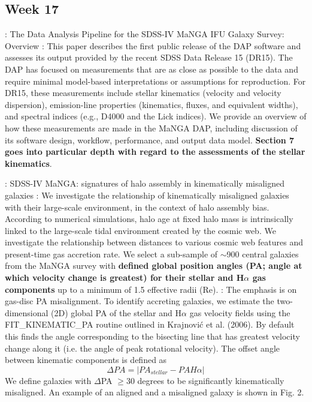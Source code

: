 \documentclass[ceqn,usenatbib,onecolumn]{mnras}
\begin{document}
\subsection{Week 17}
\par \citet{2019arXiv190100856W} : {The Data Analysis Pipeline for the SDSS-IV MaNGA IFU Galaxy Survey: Overview} : This paper describes the first public release of the DAP software and assesses its output provided by the recent SDSS Data Release 15 (DR15). The DAP has focused on measurements that are as close as possible to the data and require minimal model-based interpretations or assumptions for reproduction. For DR15, these measurements include stellar kinematics (velocity and velocity dispersion), emission-line properties (kinematics, fluxes, and equivalent widths), and spectral indices (e.g., D4000 and the Lick indices). We provide an overview of how these measurements are made in the MaNGA DAP, including discussion of its software design, workflow, performance, and output data model. \textbf{Section 7 goes into particular depth with regard to the assessments of the
stellar kinematics}.
\par \citet{2019MNRAS.483..172D} : {SDSS-IV MaNGA: signatures of halo assembly in kinematically misaligned galaxies} : We investigate the relationship of kinematically misaligned galaxies with their large-scale environment, in the context of halo assembly bias. According to numerical simulations, halo age at fixed halo mass is intrinsically linked to the large-scale tidal environment created by the cosmic web. We investigate the relationship between distances to various cosmic web features and present-time gas accretion rate. We select a sub-sample of $\sim$900 central galaxies from the MaNGA survey with \textbf{defined global position angles (PA; angle at which velocity change is greatest) for their stellar and H$\alpha$ gas components} up to a minimum of 1.5 effective radii (Re). : The emphasis is on gas-disc PA misalignment. To identify accreting galaxies, we estimate the two-dimensional (2D) global PA of the stellar and H$\alpha$ gas velocity fields using the FIT\_KINEMATIC\_PA routine outlined in Krajnović et al. (2006). By default this finds the angle corresponding to the bisecting line that has greatest velocity change along it (i.e. the angle of peak rotational velocity). The offset angle between kinematic components is defined as  
$$\Delta{PA}=|PA_{stellar}−PAH\alpha|$$
We define galaxies with $\Delta$PA $\ge 30$ degrees to be significantly kinematically misaligned. An example of an aligned and a misaligned galaxy is shown in Fig. 2.
\end{document}
